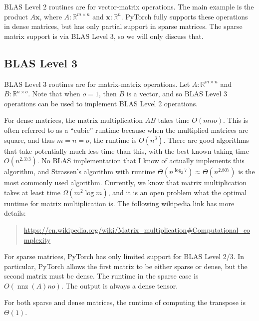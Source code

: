 \documentclass[10pt]{article}
\theoremstyle{definition}
\newcommand{\R}{\mathbb R}
\DeclareMathOperator{\nnz}{nnz}
\newcommand{\x}{\mathbf x}
\begin{document}
BLAS Level 2 routines are for vector-matrix operations.
The main example is the product $A\x$, 
where $A : \R^{m\times n}$ and $\x : \R^{n}$.
PyTorch fully supports these operations in dense matrices,
but has only partial support in sparse matrices.
The sparse matrix support is via BLAS Level 3,
so we will only discuss that.

\subsection{BLAS Level 3}

BLAS Level 3 routines are for matrix-matrix operations.
Let $A : \R^{m\times n}$ and $B : \R^{n \times o}$.
Note that when $o=1$, then $B$ is a vector, and so BLAS Level 3 operations can be used to implement BLAS Level 2 operations.

For dense matrices, the matrix multiplication $AB$ takes time $O(mno)$.
This is often referred to as a ``cubic'' runtime because when the multiplied matrices are square,
and thus $m=n=o$,
the runtime is $O(n^3)$.
There are good algorithms that take potentially much less time than this,
with the best known taking time $O(n^{2.373})$.
No BLAS implementation that I know of actually implements this algorithm,
and Strassen's algorithm with runtime $\Theta(n^{\log_2 7})\approx\Theta(n^{2.807})$ is the most commonly used algorithm.
Currently, we know that matrix multiplication takes at least time $\Omega(m^2\log m)$,
and it is an open problem what the optimal runtime for matrix multiplication is.
The following wikipedia link has more details:
\begin{quote}
\url{https://en.wikipedia.org/wiki/Matrix_multiplication#Computational_complexity}
\end{quote}

For sparse matrices, PyTorch has only limited support for BLAS Level 2/3.
In particular, PyTorch allows the first matrix to be either sparse or dense,
but the second matrix must be dense.
The runtime in the sparse case is $O(\nnz(A)no)$.
The output is always a dense tensor.

For both sparse and dense matrices,
the runtime of computing the transpose is $\Theta(1)$.
\end{document}
